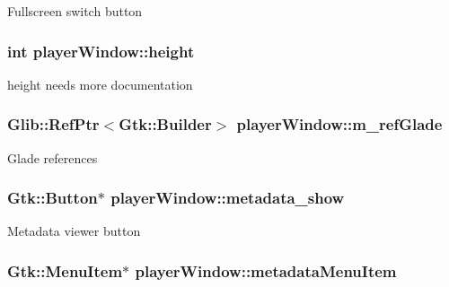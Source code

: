 Fullscreen switch button \hypertarget{classplayerWindow_a1cfcb5c9acc3220e269a4570f3f8f7a8}{
\subsubsection[{height}]{\setlength{\rightskip}{0pt plus 5cm}int player\-Window\-::height\hspace{0.3cm}{\ttfamily [protected]}}}\label{classplayerWindow_a1cfcb5c9acc3220e269a4570f3f8f7a8}
height needs more documentation \hypertarget{classplayerWindow_aec50c582b518c3ec9c4c86dde1a94127}{
\subsubsection[{m\-\_\-ref\-Glade}]{\setlength{\rightskip}{0pt plus 5cm}Glib\-::\-Ref\-Ptr$<$Gtk\-::\-Builder$>$ player\-Window\-::m\-\_\-ref\-Glade\hspace{0.3cm}{\ttfamily [protected]}}}\label{classplayerWindow_aec50c582b518c3ec9c4c86dde1a94127}
Glade references \hypertarget{classplayerWindow_a4d2470ce86d3ec380fd0cb4aac3a7ae8}{
\subsubsection[{metadata\-\_\-show}]{\setlength{\rightskip}{0pt plus 5cm}Gtk\-::\-Button$\ast$ player\-Window\-::metadata\-\_\-show\hspace{0.3cm}{\ttfamily [protected]}}}\label{classplayerWindow_a4d2470ce86d3ec380fd0cb4aac3a7ae8}
Metadata viewer button \hypertarget{classplayerWindow_af62ee9d8e38215b77a741f47c96d2d2c}{
\subsubsection[{metadata\-Menu\-Item}]{\setlength{\rightskip}{0pt plus 5cm}Gtk\-::\-Menu\-Item$\ast$ player\-Window\-::metadata\-Menu\-Item\hspace{0.3cm}{\ttfamily [protected]}}}\label{classplayerWindow_af62ee9d8e38215b77a741f47c96d2d2c}
